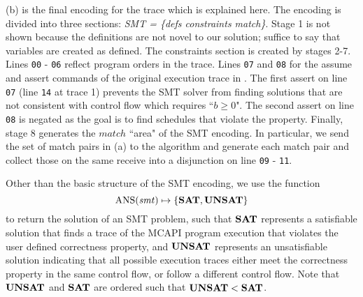 (b) is the final encoding for the trace which is
explained here. The encoding is divided into three sections:
\textit{SMT = \{defs constraints match\}}. Stage 1 is not shown
because the definitions are not novel to our solution; suffice to say
that variables are created as defined. The constraints section is created by stages 2-7. Lines \texttt{00} - \texttt{06} reflect program orders in the trace. Lines \texttt{07} and \texttt{08} for the assume and assert commands of the original execution trace in . The first assert on line \texttt{07} (line \texttt{14} at trace 1) prevents the SMT solver from finding solutions that are not consistent with control flow which requires ``$b \ge 0$". The second assert on line \texttt{08} is negated as the goal is to find schedules that violate the property. Finally, stage 8 generates the $\mathit{match}$ ``area" of the SMT encoding. In particular, we send the set of match pairs in (a) to the algorithm and generate each match pair and collect those on the same receive into a disjunction on line \texttt{09} - \texttt{11}.

Other than the basic structure of the SMT encoding, we use the function
\[\mathrm{ANS}(\mathit{smt}) \mapsto \{\mathrm{\textbf{SAT}},\mathrm{\textbf{UNSAT}}\} \]
to return the solution of an SMT problem, such that $\mathrm{\textbf{SAT}}$ represents a satisfiable solution that finds a trace of the MCAPI program execution that violates the user defined correctness property, and $\mathrm{\textbf{UNSAT}}$ represents an unsatisfiable solution indicating that all possible execution traces either meet the correctness property in the same control flow, or follow a different control flow. Note that $\mathrm{\textbf{UNSAT}}$ and $\mathrm{\textbf{SAT}}$ are ordered such that $\mathrm{\textbf{UNSAT}} < \mathrm{\textbf{SAT}}$.

